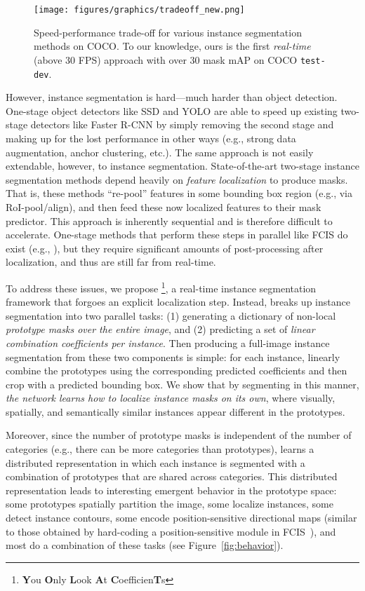 \documentclass[10pt,journal,compsoc]{IEEEtran}
\begin{document}
    \begin{figure}[t!]
    \centering
\hspace*{-0.5cm} \texttt{[image: figures/graphics/tradeoff\_new.png]}
\caption{Speed-performance trade-off for various instance segmentation methods on COCO. To our knowledge, ours is the first \emph{real-time} (above 30 FPS) approach with over 30 mask mAP on COCO {\tt test-dev}. }
\label{fig:speed_performance}
\end{figure} 
However, instance segmentation is hard---much harder than object detection. One-stage object detectors like SSD and YOLO are able to speed up existing two-stage detectors like Faster R-CNN by simply removing the second stage and making up for the lost performance in other ways (e.g., strong data augmentation, anchor clustering, etc.). The same approach is not easily extendable, however, to instance segmentation. State-of-the-art two-stage instance segmentation methods depend heavily on \emph{feature localization} to produce masks. That is, these methods ``re-pool'' features in some bounding box region (e.g., via RoI-pool/align), and then feed these now localized features to their mask predictor. This approach is inherently sequential and is therefore difficult to accelerate. One-stage methods that perform these steps in parallel like FCIS do exist (e.g., \cite{fcis, xie-polarmask2019,benbarka-fouriernet2020}), but they require significant amounts of post-processing after localization, and thus are still far from real-time.

To address these issues, we propose \methodname{}\footnote{\textbf{Y}ou \textbf{O}nly \textbf{L}ook \textbf{A}t \textbf{C}oefficien\textbf{T}s}, a real-time instance segmentation framework that forgoes an explicit localization step. Instead, \methodname{} breaks up instance segmentation into two parallel tasks: (1) generating a dictionary of non-local \textit{prototype masks over the entire image}, and (2) predicting a set of \textit{linear combination coefficients per instance}. Then producing a full-image instance segmentation from these two components is simple: for each instance, linearly combine the prototypes using the corresponding predicted coefficients and then crop with a predicted bounding box. We show that by segmenting in this manner, \textit{the network learns how to localize instance masks on its own}, where visually, spatially, and semantically similar instances appear different in the prototypes.

Moreover, since the number of prototype masks is independent of the number of categories (e.g., there can be more categories than prototypes), \methodname{} learns a distributed representation in which each instance is segmented with a combination of prototypes that are shared across categories.  This distributed representation leads to interesting emergent behavior in the prototype space: some prototypes spatially partition the image, some localize instances, some detect instance contours, some encode position-sensitive directional maps (similar to those obtained by hard-coding a position-sensitive module in FCIS~\cite{fcis}), and most do a combination of these tasks (see Figure~\ref{fig:behavior}).
\end{document}
